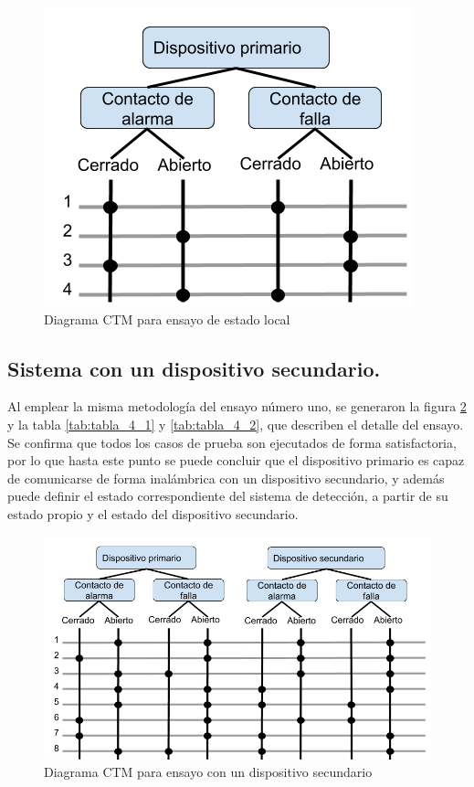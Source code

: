 \begin{figure}[ht]
	\centering
	\includegraphics[scale=.5]{./Figures/Capitulo4/Figura_J.png}
	\caption{Diagrama CTM para ensayo de estado local}
	\label{fig:figura_j}
\end{figure}

\subsection{Sistema con un dispositivo secundario.}

Al emplear la misma metodología del ensayo número uno, se generaron la figura \ref{fig:figura_k} y la tabla \ref{tab:tabla_4_1} y \ref{tab:tabla_4_2}, que describen el detalle del ensayo. Se confirma que todos los casos de prueba son ejecutados de forma satisfactoria, por lo que hasta este punto se puede concluir que el dispositivo primario es capaz de comunicarse de forma inalámbrica con un dispositivo secundario, y además puede definir el estado correspondiente del sistema de detección, a partir de su estado propio y el estado del dispositivo secundario. 

\begin{figure}[ht]
	\centering
	\includegraphics[scale=.45]{./Figures/Capitulo4/Figura_K.png}
	\caption{Diagrama CTM para ensayo con un dispositivo secundario }
	\label{fig:figura_k}
\end{figure}


